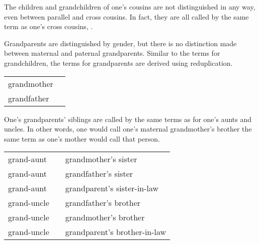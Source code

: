 The children and grandchildren of one's cousins are not distinguished in any way, even between parallel and cross cousins. In fact, they are all called by the same term as one's cross cousins, .

Grandparents are distinguished by gender, but there is no distinction made between maternal and paternal grandparents. Similar to the terms for grandchildren, the terms for grandparents are derived using reduplication.

\exdisplay\noexno
\begin{tabu} {l l}
	grandmother & \\
	grandfather & \\
\end{tabu}
\xe

One's grandparents' siblings are called by the same terms as for one's aunts and uncles. In other words, one would call one's maternal grandmother's brother the same term as one's mother would call that person.

\exdisplay\noexno
\begin{tabu} {l l l}
	grand-aunt &  & grandmother's sister\\
	grand-aunt &  & grandfather's sister\\
	grand-aunt &  & grandparent's sister-in-law\\
	grand-uncle &  & grandfather's brother\\
	grand-uncle &  & grandmother's brother\\
	grand-uncle &  & grandparent's brother-in-law\\
\end{tabu}
\xe

